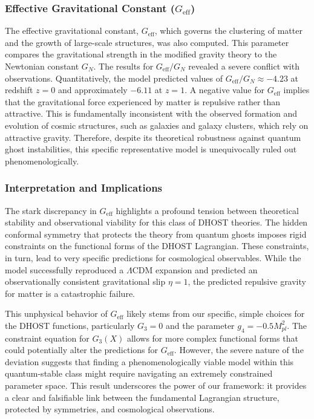 \documentclass[twocolumn]{aastex631}
\begin{document}
\subsubsection{Effective Gravitational Constant ($G_{\text{eff}}$)}
The effective gravitational constant, $G_{\text{eff}}$, which governs the clustering of matter and the growth of large-scale structures, was also computed. This parameter compares the gravitational strength in the modified gravity theory to the Newtonian constant $G_N$. The results for $G_{\text{eff}}/G_N$ revealed a severe conflict with observations. Quantitatively, the model predicted values of $G_{\text{eff}}/G_N \approx -4.23$ at redshift $z=0$ and approximately $-6.11$ at $z=1$. A negative value for $G_{\text{eff}}$ implies that the gravitational force experienced by matter is repulsive rather than attractive. This is fundamentally inconsistent with the observed formation and evolution of cosmic structures, such as galaxies and galaxy clusters, which rely on attractive gravity. Therefore, despite its theoretical robustness against quantum ghost instabilities, this specific representative model is unequivocally ruled out phenomenologically.

\subsubsection{Interpretation and Implications}
The stark discrepancy in $G_{\text{eff}}$ highlights a profound tension between theoretical stability and observational viability for this class of DHOST theories. The hidden conformal symmetry that protects the theory from quantum ghosts imposes rigid constraints on the functional forms of the DHOST Lagrangian. These constraints, in turn, lead to very specific predictions for cosmological observables. While the model successfully reproduced a $\Lambda$CDM expansion and predicted an observationally consistent gravitational slip $\eta=1$, the predicted repulsive gravity for matter is a catastrophic failure.

This unphysical behavior of $G_{\text{eff}}$ likely stems from our specific, simple choices for the DHOST functions, particularly $G_3=0$ and the parameter $g_4 = -0.5 M_{pl}^2$. The constraint equation for $G_3(X)$ allows for more complex functional forms that could potentially alter the predictions for $G_{\text{eff}}$. However, the severe nature of the deviation suggests that finding a phenomenologically viable model within this quantum-stable class might require navigating an extremely constrained parameter space. This result underscores the power of our framework: it provides a clear and falsifiable link between the fundamental Lagrangian structure, protected by symmetries, and cosmological observations.
\end{document}
